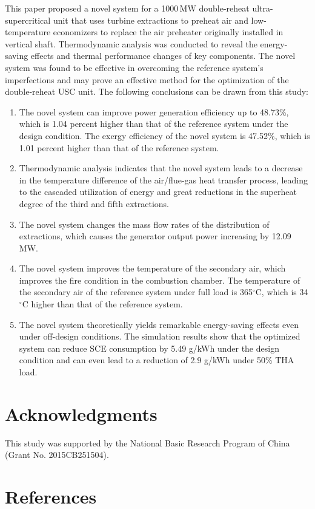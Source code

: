 \documentclass[preprint,12pt]{elsarticle}
\begin{document}
This paper proposed a novel system for a 1000\,MW double-reheat ultra-supercritical unit that uses turbine extractions to preheat air and low-temperature economizers to replace the air preheater originally installed in vertical shaft.
Thermodynamic analysis was conducted to reveal the energy-saving effects and thermal performance changes of key components. 
The novel system was found to be effective in overcoming the reference system's imperfections 
and may prove an effective method for the optimization of the double-reheat USC unit.
The following conclusions can be drawn from this study: 
 \begin{enumerate}[(1)]
 \item The novel system can improve power generation efficiency up to 48.73\%, which is 1.04 percent higher than that of the reference system under the design condition. The exergy efficiency of the novel system is 47.52\%, which is 1.01 percent higher than that of the reference system.
 \item Thermodynamic analysis indicates that the novel system leads to a decrease in the temperature difference of the air/flue-gas heat transfer process, leading to the cascaded utilization of energy and great reductions in the superheat degree of the third and fifth extractions.
\item The novel system changes the mass flow rates of the distribution of extractions, which causes the generator output power increasing by 12.09 MW. 
\item The novel system improves the temperature of the secondary air, which improves the fire condition in the combustion chamber.
 The temperature of the secondary air of the reference system under full load is 365$^\circ$C, which is 34$^\circ$C higher than that of the reference system.
\item The novel system theoretically yields remarkable energy-saving effects even under off-design conditions. The simulation results show that the optimized system can reduce SCE consumption by 5.49 g/kWh under the design condition and can even lead to a reduction of 2.9 g/kWh under 50\% THA load.
\end{enumerate}
\section*{Acknowledgments}
This study was supported by the National Basic Research Program of China (Grant No. 2015CB251504).
\section*{References}

\end{document}

